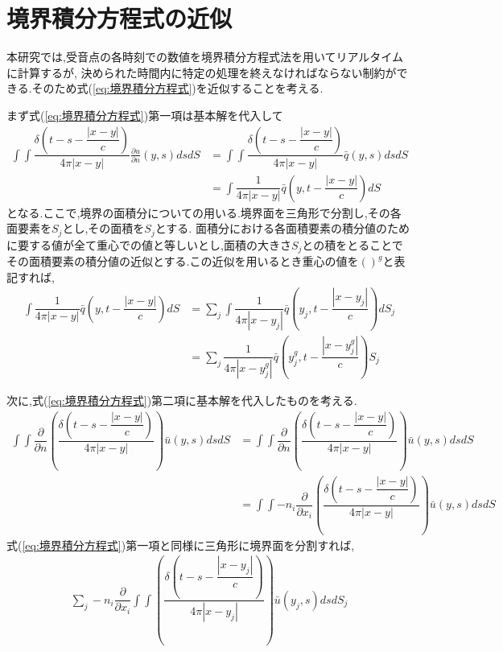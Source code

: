 \documentclass[dvipdfmx]{ampbt}
\begin{document}
\section{境界積分方程式の近似}
\label{kinji}
本研究では,受音点の各時刻での数値を境界積分方程式法を用いてリアルタイムに計算するが,%
決められた時間内に特定の処理を終えなければならない制約ができる.そのため式(\ref{eq:境界積分方程式})を近似することを考える.\par
まず式(\ref{eq:境界積分方程式})第一項は基本解を代入して
\begin{align}
\int\!\!\!\int \dfrac{\delta(t-s-\dfrac{|x-y|}{c})}{4\pi|x-y|} \frac{\partial u}{\partial n}(y,s)dsdS
&= \int\!\!\!\int \dfrac{\delta(t-s-\dfrac{|x-y|}{c})}{4\pi|x-y|} \bar{q}(y,s)dsdS\\
&= \int\!\!\! \dfrac{1}{4\pi|x-y|} \bar{q}(y,t-\dfrac{|x-y|}{c})dS
\end{align}
となる.ここで,境界の面積分についての用いる.境界面を三角形で分割し,その各面要素を$S_j$とし,その面積を$S_j$とする.
面積分における各面積要素の積分値のために要する値が全て重心での値と等しいとし,面積の大きさ$S_j$との積をとることで
その面積要素の積分値の近似とする.この近似を用いるとき重心の値を$( )^g$と表記すれば,
\begin{align}
\int\!\!\! \dfrac{1}{4\pi|x-y|} \bar{q}(y,t-\dfrac{|x-y|}{c})dS &= \sum_j \int\!\!\! \dfrac{1}{4\pi|x-y_j|} \bar{q}(y_j,t-\dfrac{|x-y_j|}{c})dS_j \nonumber \\
&=\sum_j \dfrac{1}{4\pi|x-y_j^g|} \bar{q}(y_j^g,t-\dfrac{|x-y_j^g|}{c})S_j
\end{align}
\par
次に,式(\ref{eq:境界積分方程式})第二項に基本解を代入したものを考える.
\begin{align}
\int\!\!\!\int \dfrac{\partial}{\partial n}\left( \dfrac{\delta(t-s-\dfrac{|x-y|}{c})}{4\pi|x-y|} \right) \bar{u}(y,s) ds dS
&= \int\!\!\!\int \dfrac{\partial}{\partial n}\left( \dfrac{\delta(t-s-\dfrac{|x-y|}{c})}{4\pi|x-y|} \right) \bar{u}(y,s) ds dS \nonumber \\
&= \int\!\!\!\int -n_i\dfrac{\partial}{\partial x_i}\left( \dfrac{\delta(t-s-\dfrac{|x-y|}{c})}{4\pi|x-y|} \right) \bar{u}(y,s) ds dS
\end{align}
式(\ref{eq:境界積分方程式})第一項と同様に三角形に境界面を分割すれば,
\begin{align}
\sum_j -n_i\dfrac{\partial}{\partial x_i}\int\!\!\!\int \left( \dfrac{\delta(t-s-\dfrac{|x-y_j|}{c})}{4\pi|x-y_j|} \right) \bar{u}(y_j,s) ds dS_j
\end{align}
\end{document}
